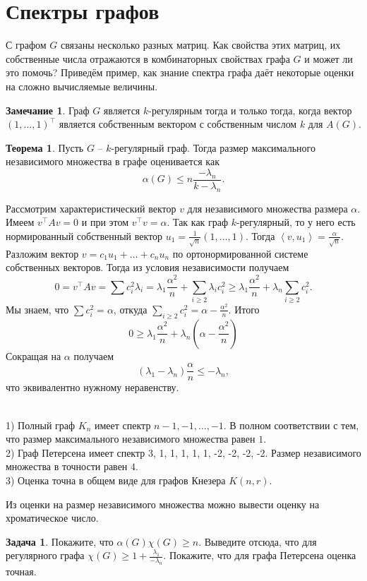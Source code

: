 \documentclass[12pt,a4paper,oneside]{book}
\theoremstyle{definition}
\newtheorem*{rem}{\color{green!50!blue}Замечание}
\newtheorem{zad}{\color{violet!100!black}Задача}
\newtheorem{thm}{\color{red!40!black}Теорема}
\renewcommand{\leq}{\leqslant}
\renewcommand{\geq}{\geqslant}
\def\exm{\noindent {\bf Примеры:}}
\def\lan{\left\langle }
\def\ran{\right\rangle}
\def\thrm{\begin{thm}}
\def\ethrm{\end{thm}}
\def\zd{\begin{zad}}
\def\ezd{\end{zad}}
\def\rm{\begin{rem}}
\def\erm{\end{rem}}
\begin{document}
\section{Спектры графов}
С графом $G$ связаны несколько разных матриц. Как свойства этих матриц, их собственные числа отражаются в комбинаторных свойствах графа $G$ и может ли это помочь?
Приведём пример, как знание спектра графа даёт некоторые оценки на сложно вычисляемые величины.

\rm Граф $G$ является $k$-регулярным тогда и только тогда, когда вектор $(1,\dots,1)^\top$ является собственным вектором с собственным числом $k$ для $A(G)$.
\erm

\thrm Пусть $G$ -- $k$-регулярный граф. Тогда размер максимального независимого множества в графе оценивается как
$$\alpha(G)\leq n\frac{-\lambda_n}{k-\lambda_n}.$$
\ethrm
\proof Рассмотрим характеристический вектор $v$ для независимого множества размера $\alpha$. Имеем $v^{\top}Av=0$ и при этом $v^{\top}v=\alpha$. Так как граф $k$-регулярный, то у него есть нормированный собственный вектор $u_1=\frac{1}{\sqrt{n}}(1,\dots,1)$. Тогда $\lan v,u_1\ran = \frac{\alpha}{\sqrt{n}}$. Разложим вектор $v=c_1u_1 + \dots + c_n u_n$ по ортонормированной системе собственных векторов. Тогда из условия независимости получаем
$$0=v^{\top}Av=\sum c_i^2 \lambda_i= \lambda_1\frac{\alpha^2}{n}+ \sum_{i\geq 2} \lambda_i c_i^2\geq \lambda_1\frac{\alpha^2}{n}+ \lambda_n \sum_{i\geq 2} c_i^2.$$
Мы знаем, что $\sum c_i^2=\alpha$, откуда $\sum_{i\geq 2} c_i^2=\alpha - \frac{\alpha^2}{n}$. Итого 
$$0\geq \lambda_1\frac{\alpha^2}{n}+\lambda_n(\alpha- \frac{\alpha^2}{n})$$
Сокращая на $\alpha$ получаем 
$$(\lambda_1-\lambda_n)\frac{\alpha}{n}\leq -\lambda_n,$$
что эквивалентно нужному неравенству.
\endproof




\exm\\
1) Полный граф $K_n$ имеет спектр $n-1,-1,\dots,-1$. В полном соответствии с тем, что размер максимального независимого множества равен $1$.\\
2) Граф Петерсена имеет спектр 3, 1, 1, 1, 1, 1, -2, -2, -2, -2. Размер независимого множества в точности равен $4$.\\
3) Оценка точна в общем виде для графов Кнезера $K(n,r)$.


Из оценки на размер независимого множества можно вывести оценку на хроматическое число.

\zd Покажите, что $\alpha(G) \chi(G) \geq n$. Выведите отсюда, что для регулярного графа $\chi(G)\geq 1+ \frac{\lambda_1}{-\lambda_n}$. Покажите, что для графа Петерсена оценка точная.
\ezd
\end{document}
